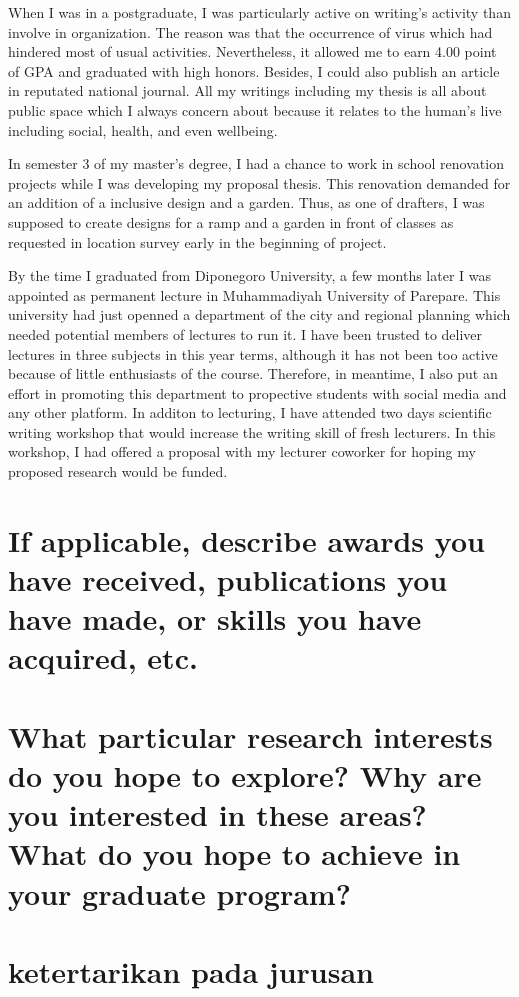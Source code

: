 \documentclass[11pt]{simart} %
\begin{document}
When I was in a postgraduate, I was particularly active on writing's activity than involve in organization. The reason was that the occurrence of virus which had hindered most of usual activities. Nevertheless, it allowed me to earn 4.00 point of GPA and graduated with high honors. Besides, I could also publish an article in reputated national journal. All my writings including my thesis is all about public space which I always concern about because it relates to the human's live including social, health, and even wellbeing.

In semester 3 of my master's degree, I had a chance to work in school renovation projects while I was developing my proposal thesis. This renovation demanded for an addition of a inclusive design and a garden. Thus, as one of drafters, I was supposed to create designs for a ramp and a garden in front of classes as requested in location survey early in the beginning of project. %

By the time I graduated from Diponegoro University, a few months later I was appointed as permanent lecture in Muhammadiyah University of Parepare.
This university had just openned a department of the city and regional planning which needed potential members of lectures to run it.
I have been trusted to deliver lectures in three subjects in this year terms, although it has not been too active because of little enthusiasts of the course.
Therefore, in meantime, I also put an effort in promoting this department to propective students with social media and any other platform.
In additon to lecturing, I have attended two days scientific writing workshop that would increase the writing skill of fresh lecturers. In this workshop, I had offered a proposal with my lecturer coworker for hoping my proposed research would be funded.


\section{If applicable, describe awards you have received, publications you have made, or skills you have acquired, etc.}

\section{What particular research interests do you hope to explore? Why are you interested in these areas? What do you hope to achieve in your graduate program?}
\section*{ketertarikan pada jurusan}
\end{document}
